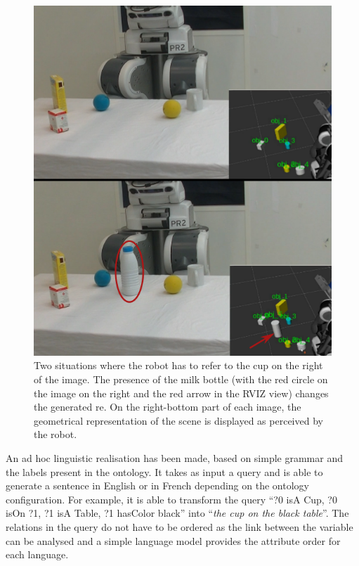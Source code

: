 \begin{figure}[t!]
\centering
\includegraphics[scale=0.75]{figures/chapter4/pr2.png}
\caption{\label{fig:chap4_pr2} Two situations where the robot has to refer to the cup on the right of the image. The presence of the milk bottle (with the red circle on the image on the right and the red arrow in the RVIZ view) changes the generated \acrshort{re}. On the right-bottom part of each image, the geometrical representation of the scene is displayed as perceived by the robot.}
\end{figure}

An ad hoc linguistic realisation has been made, based on simple grammar and the labels present in the ontology. It takes as input a \sparql{} query and is able to generate a sentence in English or in French depending on the ontology configuration. For example, it is able to transform the query ``?0 isA Cup, ?0 isOn ?1, ?1 isA Table, ?1 hasColor black'' into ``\textit{the cup on the black table}''. The relations in the query do not have to be ordered as the link between the variable can be analysed and a simple language model provides the attribute order for each language.

